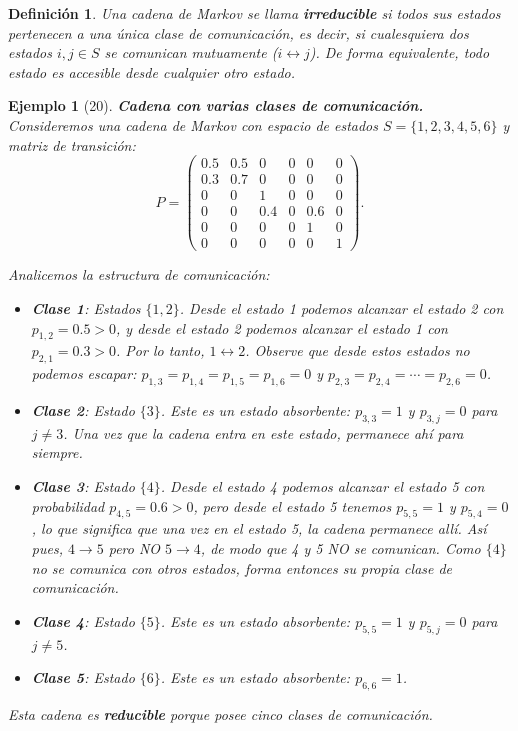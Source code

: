 \documentclass[12pt]{book}
\newtheorem{definition}{Definición}[chapter]
\newtheorem{example}{Ejemplo}[chapter]
\begin{document}
\begin{definition}
Una cadena de Markov se llama \textbf{irreducible} si todos sus estados pertenecen a una única clase de comunicación, es decir, si cualesquiera dos estados $i, j \in S$ se comunican mutuamente ($i \leftrightarrow j$). De forma equivalente, todo estado es accesible desde cualquier otro estado.
\end{definition}

\begin{example}[20]
\textbf{Cadena con varias clases de comunicación.} Consideremos una cadena de Markov con espacio de estados $S = \{1, 2, 3, 4, 5, 6\}$ y matriz de transición:
\[
P = \begin{pmatrix}
0.5 & 0.5 & 0 & 0 & 0 & 0 \\
0.3 & 0.7 & 0 & 0 & 0 & 0 \\
0 & 0 & 1 & 0 & 0 & 0 \\
0 & 0 & 0.4 & 0 & 0.6 & 0 \\
0 & 0 & 0 & 0 & 1 & 0 \\
0 & 0 & 0 & 0 & 0 & 1
\end{pmatrix}.
\]

Analicemos la estructura de comunicación:
\begin{itemize}
    \item \textbf{Clase 1}: Estados $\{1, 2\}$. Desde el estado 1 podemos alcanzar el estado 2 con $p_{1,2} = 0.5 > 0$, y desde el estado 2 podemos alcanzar el estado 1 con $p_{2,1} = 0.3 > 0$. Por lo tanto, $1 \leftrightarrow 2$. Observe que desde estos estados no podemos escapar: $p_{1,3} = p_{1,4} = p_{1,5} = p_{1,6} = 0$ y $p_{2,3} = p_{2,4} = \cdots = p_{2,6} = 0$.
    
    \item \textbf{Clase 2}: Estado $\{3\}$. Este es un estado absorbente: $p_{3,3} = 1$ y $p_{3,j} = 0$ para $j \neq 3$. Una vez que la cadena entra en este estado, permanece ahí para siempre. 
    
    \item \textbf{Clase 3}: Estado $\{4\}$. Desde el estado 4 podemos alcanzar el estado 5 con probabilidad $p_{4,5} = 0.6 > 0$, pero desde el estado 5 tenemos $p_{5,5} = 1$ y $p_{5,4} = 0$, lo que significa que una vez en el estado 5, la cadena permanece allí. Así pues, $4 \to 5$ pero NO $5 \to 4$, de modo que 4 y 5 NO se comunican. Como $\{4\}$ no se comunica con otros estados, forma entonces su propia clase de comunicación.
    \item \textbf{Clase 4}: Estado $\{5\}$. Este es un estado absorbente: $p_{5,5} = 1$ y $p_{5,j} = 0$ para $j \neq 5$. 
    \item \textbf{Clase 5}: Estado $\{6\}$. Este es un estado absorbente: $p_{6,6} = 1$.
\end{itemize}


Esta cadena es \textbf{reducible} porque posee cinco clases de comunicación.
\end{example}
\end{document}
